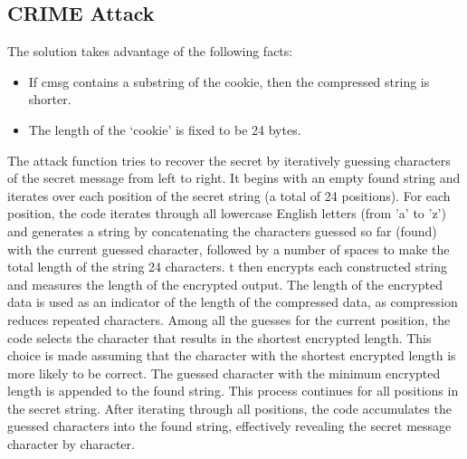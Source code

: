 \documentclass{article}
\begin{document}
\subsection{CRIME Attack}

The solution takes advantage of the following facts:
\begin{itemize}
    \item If cmsg contains a substring of the cookie, then the compressed string is shorter.
    \item The length of the ‘cookie’ is fixed to be 24 bytes.
\end{itemize}
The attack function tries to recover the secret by iteratively guessing characters of the secret message from left to right. It begins with an empty found string and iterates over each position of the secret string (a total of 24 positions). For each position, the code iterates through all lowercase English letters (from 'a' to 'z') and generates a string by concatenating the characters guessed so far (found) with the current guessed character, followed by a number of spaces to make the total length of the string 24 characters. t then encrypts each constructed string and measures the length of the encrypted output. The length of the encrypted data is used as an indicator of the length of the compressed data, as compression reduces repeated characters. Among all the guesses for the current position, the code selects the character that results in the shortest encrypted length. This choice is made assuming that the character with the shortest encrypted length is more likely to be correct. The guessed character with the minimum encrypted length is appended to the found string. This process continues for all positions in the secret string. After iterating through all positions, the code accumulates the guessed characters into the found string, effectively revealing the secret message character by character.
\newpage
\end{document}
